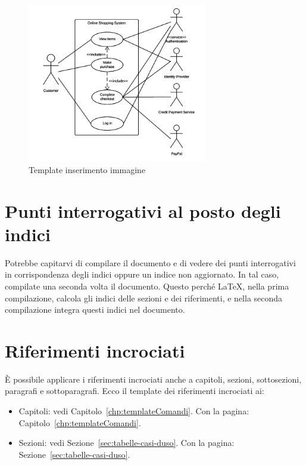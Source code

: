 \begin{figure}
	\centering
	\includegraphics[width=0.7\textwidth]{imgs/file-comuni-ai-gruppi/useCaseEsempio.png}
	\caption{Template inserimento immagine}
	\label{fig:template-inserimento-immagine}
\end{figure}

\section{Punti interrogativi al posto degli indici}

Potrebbe capitarvi di compilare il documento e di vedere dei punti interrogativi in corrispondenza degli indici oppure un indice non aggiornato. In tal caso, compilate una seconda volta il documento. Questo perché \LaTeX , nella prima compilazione, calcola gli indici delle sezioni e dei riferimenti, e nella seconda compilazione integra questi indici nel documento.

\section{Riferimenti incrociati}

È possibile applicare i riferimenti incrociati anche a capitoli, sezioni, sottosezioni, paragrafi e sottoparagrafi. Ecco il template dei riferimenti incrociati ai:

\begin{itemize}
\item
Capitoli: vedi Capitolo~\ref{chp:templateComandi}. Con la pagina: Capitolo~\vref{chp:templateComandi}.
\item
Sezioni: vedi Sezione~\ref{sec:tabelle-casi-duso}. Con la pagina: Sezione~\vref{sec:tabelle-casi-duso}.
\end{itemize}

